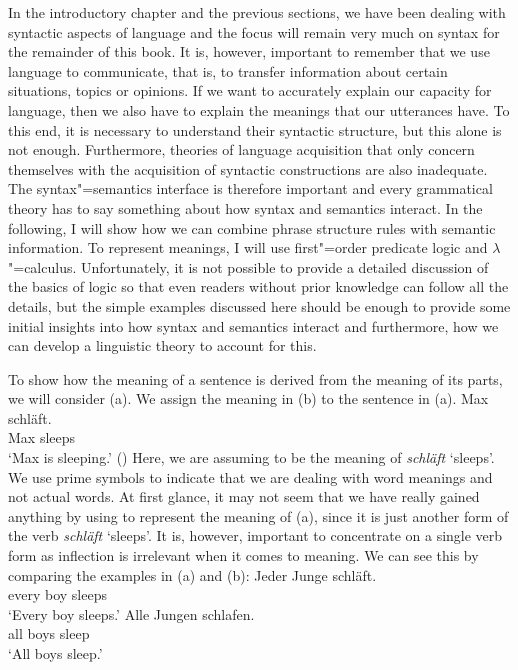 In the introductory chapter and the previous sections, we have been dealing with syntactic aspects
of language and the focus will remain very much on syntax for the remainder of this book. It is,
however, important to remember that we use language to communicate, that is, to transfer information
about certain situations, topics or opinions. If we want to accurately explain our capacity for
language, then we also have to explain the meanings that our utterances have. To this end, it is
necessary to understand their syntactic structure, but this alone is not enough. Furthermore,
theories of language acquisition that only concern themselves with the acquisition of syntactic
constructions are also inadequate. The syntax"=semantics interface
is therefore important and every grammatical theory has to say something about how syntax and
semantics interact. In the following, I will show how we can combine phrase structure rules with
semantic information. To represent meanings, I will use first"=order predicate logic and
$\lambda$"=calculus. Unfortunately, it is not possible to provide a detailed
discussion of the basics of logic so that even readers without prior knowledge can follow all the
details, but the simple examples discussed here should be enough to provide some initial
insights into how syntax and semantics interact and furthermore, how we can develop a linguistic
theory to account for this.

To show how the meaning of a sentence is derived from the meaning of its parts, we will consider (a). We
assign the meaning in (b) to the sentence in (a). 
\eal
\ex\label{Bsp-Max-schlaeft}
\gll Max schläft.\\
     Max sleeps\\
\glt `Max is sleeping.'
\ex\label{Bsp-schlafen-max} 
()
\zl
\addlines[2]
Here, we are assuming  to be the meaning of  \emph{schläft} `sleeps'. We use prime symbols to indicate
that we are dealing with word meanings and not actual words. At first glance, it may not seem that we have really gained anything
by using  to represent the meaning of (a), since it is just another form of the verb \emph{schläft} `sleeps'.
It is, however, important to concentrate on a single verb form as inflection is irrelevant when it comes to meaning. We can see this by comparing the 
examples in (a) and (b):
\eal
\ex 
\gll Jeder Junge schläft.\\
     every boy sleeps\\
\glt `Every boy sleeps.'
\ex 
\gll Alle Jungen schlafen.\\
     all boys sleep\\
\glt `All boys sleep.'	 
\zl

